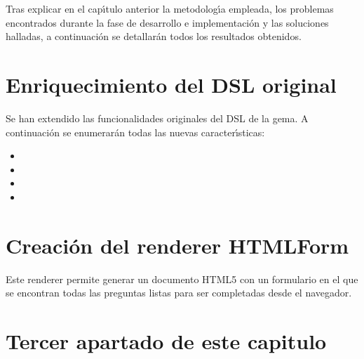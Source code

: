 


Tras explicar en el cap\'{\i}tulo anterior la metodolog\'{\i}a empleada, los problemas encontrados
durante la fase de desarrollo e implementaci\'on y las soluciones halladas, a continuaci\'on se
detallar\'an todos los resultados obtenidos.

\section{Enriquecimiento del DSL original}
\label{3:sec1}

Se han extendido las funcionalidades originales del DSL de la gema. A continuaci\'on se enumerar\'an
todas las nuevas caracter\'{\i}sticas:

\begin{itemize}
  \item 
  \item 
  \item 
  \item 
\end{itemize}

\section{Creaci\'on del renderer HTMLForm}
\label{3:sec2}

Este renderer permite generar un documento HTML5 con un formulario en el que se encontran todas las
preguntas listas para ser completadas desde el navegador.

\section{Tercer apartado de este capitulo}
\label{:sec3}
